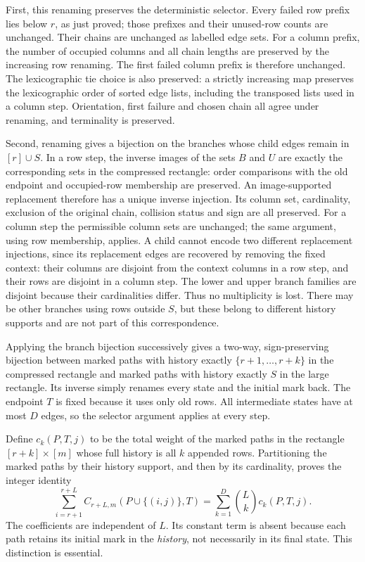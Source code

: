 \documentclass[11pt,a4paper,oneside,openany]{book}
\theoremstyle{definition}\newtheorem{definition}[theorem]{Definition}
\theoremstyle{remark}\newtheorem{remark}[theorem]{Remark}
\numberwithin{equation}{chapter}
\begin{document}
First, this renaming preserves the deterministic selector.  Every failed
row prefix lies below $r$, as just proved; those prefixes and their
unused-row counts are unchanged.  Their chains are unchanged as labelled
edge sets.  For a column prefix, the number of occupied columns and all
chain lengths are preserved by the increasing row renaming.  The first
failed column prefix is therefore unchanged.  The lexicographic tie
choice is also preserved: a strictly increasing map preserves the
lexicographic order of sorted edge lists, including the transposed lists
used in a column step.  Orientation, first failure and chosen chain all
agree under renaming, and terminality is preserved.

Second, renaming gives a bijection on the branches whose child edges
remain in $[r]\cup S$.  In a row step, the inverse images of the sets
$B$ and $U$ are exactly the corresponding sets in the compressed
rectangle: order comparisons with the old endpoint and occupied-row
membership are preserved.  An image-supported replacement therefore
has a unique inverse injection.  Its column set, cardinality, exclusion
of the original chain, collision status and sign are all preserved.
For a column step the permissible column sets are unchanged; the same
argument, using row membership, applies.  A child cannot encode two
different replacement injections, since its replacement edges are
recovered by removing the fixed context: their columns are disjoint
from the context columns in a row step, and their rows are disjoint
in a column step.  The lower and upper branch families are disjoint
because their cardinalities differ.  Thus no multiplicity is lost.
There may be other branches using rows outside $S$, but these belong to
different history supports and are not part of this correspondence.

Applying the branch bijection successively gives a two-way, sign-preserving
bijection between marked paths with history exactly
$\{r+1,\ldots,r+k\}$ in the compressed rectangle and marked paths with
history exactly $S$ in the large rectangle.  Its inverse simply renames
every state and the initial mark back.  The endpoint $T$ is fixed because
it uses only old rows.  All intermediate states have at most $D$ edges,
so the selector argument applies at every step.

Define $c_k(P,T,j)$ to be the total weight of the marked paths in the
rectangle $[r+k]\times[m]$ whose full history is all $k$ appended rows.
Partitioning the marked paths by their history support, and then by its
cardinality, proves the integer identity
\begin{equation}\label{tx:eq:marked-coordinate}
 \sum_{i=r+1}^{r+L}
       C_{r+L,m}(P\cup\{(i,j)\},T)
    =\sum_{k=1}^{D}\binom{L}{k}c_k(P,T,j).
\end{equation}
The coefficients are independent of $L$.  Its constant term is absent
because each path retains its initial mark in the \emph{history}, not
necessarily in its final state.  This distinction is essential.
\end{document}
